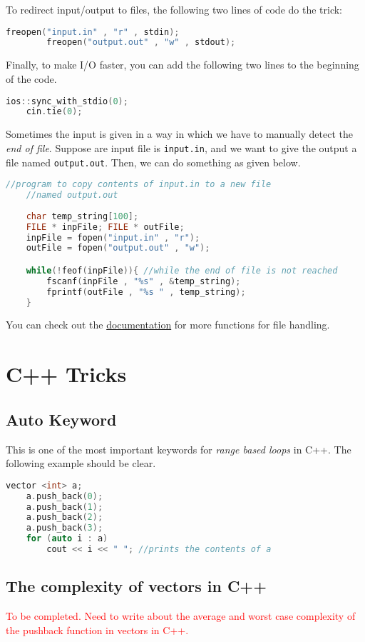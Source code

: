 \documentclass[12pt,a4paper]{amsart}
\numberwithin{equation}{section}
\theoremstyle{definition}
\begin{document}
To redirect input/output to files, the following two lines of code do the trick: 
    \begin{lstlisting}[language=C++]
        freopen("input.in" , "r" , stdin);
        freopen("output.out" , "w" , stdout);
    \end{lstlisting}
Finally, to make I/O faster, you can add the following two lines to the beginning of the code.

\begin{lstlisting}[language=C++]
    ios::sync_with_stdio(0);
    cin.tie(0);
\end{lstlisting}

\noindent Sometimes the input is given in a way in which we have to manually detect the \textit{end of file}. Suppose are input file is \verb|input.in|, and we want to give the output a file named \verb|output.out|. Then, we can do something as given below. 
\begin{lstlisting}[language=C++]
    //program to copy contents of input.in to a new file 
    //named output.out
    
    char temp_string[100];
    FILE * inpFile; FILE * outFile;
    inpFile = fopen("input.in" , "r");
    outFile = fopen("output.out" , "w");

    while(!feof(inpFile)){ //while the end of file is not reached
        fscanf(inpFile , "%s" , &temp_string);
        fprintf(outFile , "%s " , temp_string);
    }
\end{lstlisting}
You can check out the \href{http://www.cplusplus.com/reference/cstdio/fseek/}{documentation} for more functions for file handling. 
\section{C++ Tricks}

\subsection{Auto Keyword} This is one of the most important keywords for \textit{range based loops} in C++. The following example should be clear. 

\begin{lstlisting}[language=C++]
    vector <int> a;
    a.push_back(0);
    a.push_back(1);
    a.push_back(2);
    a.push_back(3);
    for (auto i : a)
        cout << i << " "; //prints the contents of a
\end{lstlisting}

\subsection{The complexity of vectors in C++} \textcolor{red}{To be completed. Need to write about the average and worst case complexity of the pushback function in vectors in C++.}
\end{document}
